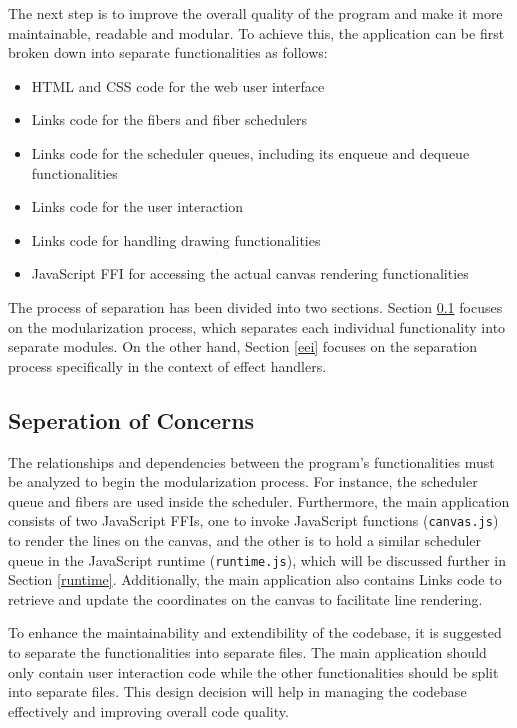 \documentclass[logo,bsc,singlespacing,parskip]{infthesis}
\begin{document}
The next step is to improve the overall quality of the program and make it more maintainable, readable and modular. To achieve this, the application can be first broken down into separate functionalities as follows:
\begin{itemize}
  \item HTML and CSS code for the web user interface
  \item Links code for the fibers and fiber schedulers
  \item Links code for the scheduler queues, including its enqueue and dequeue functionalities
  \item Links code for the user interaction
  \item Links code for handling drawing functionalities
  \item JavaScript FFI for accessing the actual canvas rendering functionalities
\end{itemize}

The process of separation has been divided into two sections. Section \ref{soc} focuses on the modularization process, which separates each individual functionality into separate modules. On the other hand, Section \ref{eei} focuses on the separation process specifically in the context of effect handlers.

\subsection{Seperation of Concerns}
\label{soc}
The relationships and dependencies between the program's functionalities must be analyzed to begin the modularization process. For instance, the scheduler queue and fibers are used inside the scheduler. Furthermore, the main application consists of two JavaScript FFIs, one to invoke JavaScript functions (\texttt{canvas.js}) to render the lines on the canvas, and the other is to hold a similar scheduler queue in the JavaScript runtime (\texttt{runtime.js}), which will be discussed further in Section \ref{runtime}. Additionally, the main application also contains Links code to retrieve and update the coordinates on the canvas to facilitate line rendering. 

To enhance the maintainability and extendibility of the codebase, it is suggested to separate the functionalities into separate files. The main application should only contain user interaction code while the other functionalities should be split into separate files. This design decision will help in managing the codebase effectively and improving overall code quality.
\end{document}
